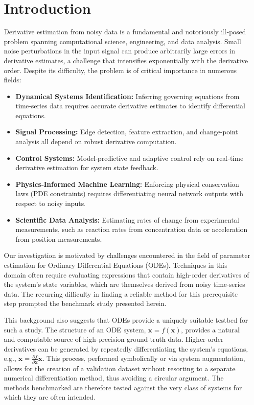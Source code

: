 \section{Introduction}
\label{sec:introduction}

Derivative estimation from noisy data is a fundamental and notoriously ill-posed problem spanning computational science, engineering, and data analysis. Small noise perturbations in the input signal can produce arbitrarily large errors in derivative estimates, a challenge that intensifies exponentially with the derivative order. Despite its difficulty, the problem is of critical importance in numerous fields:

\begin{itemize}
    \item \textbf{Dynamical Systems Identification:} Inferring governing equations from time-series data requires accurate derivative estimates to identify differential equations.
    \item \textbf{Signal Processing:} Edge detection, feature extraction, and change-point analysis all depend on robust derivative computation.
    \item \textbf{Control Systems:} Model-predictive and adaptive control rely on real-time derivative estimation for system state feedback.
    \item \textbf{Physics-Informed Machine Learning:} Enforcing physical conservation laws (PDE constraints) requires differentiating neural network outputs with respect to noisy inputs.
    \item \textbf{Scientific Data Analysis:} Estimating rates of change from experimental measurements, such as reaction rates from concentration data or acceleration from position measurements.
\end{itemize}

Our investigation is motivated by challenges encountered in the field of parameter estimation for Ordinary Differential Equations (ODEs). Techniques in this domain often require evaluating expressions that contain high-order derivatives of the system's state variables, which are themselves derived from noisy time-series data. The recurring difficulty in finding a reliable method for this prerequisite step prompted the benchmark study presented herein.

This background also suggests that ODEs provide a uniquely suitable testbed for such a study. The structure of an ODE system, $\dot{\mathbf{x}} = f(\mathbf{x})$, provides a natural and computable source of high-precision ground-truth data. Higher-order derivatives can be generated by repeatedly differentiating the system's equations, e.g., $\ddot{\mathbf{x}} = \frac{\partial f}{\partial \mathbf{x}} \dot{\mathbf{x}}$. This process, performed symbolically or via system augmentation, allows for the creation of a validation dataset without resorting to a separate numerical differentiation method, thus avoiding a circular argument. The methods benchmarked are therefore tested against the very class of systems for which they are often intended.

